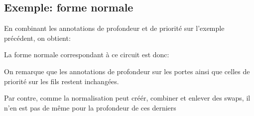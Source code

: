 \documentclass[12pt, a4paper]{article}
\begin{document}
\subsection{Exemple: forme normale}
\label{ann:nf}

En combinant les annotations de profondeur et de priorité sur l'exemple précédent, on obtient:

\begin{center}
    
\end{center}

La forme normale correspondant à ce circuit est donc:

\begin{center}
    
\end{center}

On remarque que les annotations de profondeur sur les portes ainsi que celles de priorité sur les fils restent inchangées.

Par contre, comme la normalisation peut créér, combiner et enlever des swaps, il n'en est pas de même pour la profondeur de ces derniers
\end{document}

